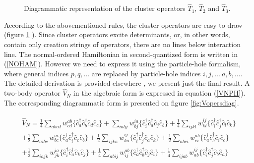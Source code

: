 \documentclass[twoside,english]{uiofysmaster}
\begin{document}
\begin{figure}[h!]
	\centering
	\bdiags
	\ediag
	\bdiags
	\ediag
	\bdiags
	\ediag
	\caption{Diagrammatic representation of the cluster operators $\hat{T}_1$, $\hat{T}_2$ and $\hat{T}_3$.} \label{fig:Topersdiag}
\end{figure}

According to the abovementioned rules, the cluster operators are easy
to draw (figure \ref{fig:Topersdiag} ). Since cluster operators excite
determinants, or, in other words, contain only creation strings of
operators, there are no lines below interaction line. The
normal-ordered Hamiltonian in second-quantized form is written in
(\ref{NOHAM}). However we need to express it using the particle-hole
formalism, where general indices $p,q,\dots$ are replaced by
particle-hole indices $i,j,\dots \ a,b,\dots$. The detailed derivation
is provided elsewhere \cite{S.KvaalLectureNotesFysKjm44802015}, we
present just the final result. A two-body operator $\hat{V}_N$ in the
algebraic form is expressed in equation (\ref{VNPH}). The
corresponding diagrammatic form is presented on figure
\ref{fig:Vopersdiag}.

\begin{align}\label{VNPH}
\begin{split}
\hat{V}_N = \frac{1}{4}\sum_{abcd} w^{ab}_{cd} \{\hat{c}^\dagger_a\hat{c}^\dagger_b\hat{c}_d\hat{c}_c\} + \sum_{iabj} w^{ia}_{bj} \{\hat{c}^\dagger_i\hat{c}^\dagger_a\hat{c}_j\hat{c}_b\} + \frac{1}{4}\sum_{ijkl} w^{ij}_{kl} \{\hat{c}^\dagger_i\hat{c}^\dagger_j\hat{c}_l\hat{c}_k\} \\+ \frac{1}{2}\sum_{aibc} w^{ai}_{bc} \{\hat{c}^\dagger_a\hat{c}^\dagger_i\hat{c}_c\hat{c}_b\} + \frac{1}{2}\sum_{ijka} w^{ij}_{ka} \{\hat{c}^\dagger_i\hat{c}^\dagger_j\hat{c}_a\hat{c}_k\} + \frac{1}{2}\sum_{abci} w^{ab}_{ci} \{\hat{c}^\dagger_a\hat{c}^\dagger_b\hat{c}_i\hat{c}_c\} \\+ \frac{1}{2}\sum_{iajk} w^{ia}_{jk} \{\hat{c}^\dagger_i\hat{c}^\dagger_a\hat{c}_k\hat{c}_j\} + \frac{1}{4}\sum_{abij} w^{ab}_{ij} \{\hat{c}^\dagger_a\hat{c}^\dagger_b\hat{c}_j\hat{c}_i\} + \frac{1}{4}\sum_{ijab} w^{ij}_{ab} \{\hat{c}^\dagger_i\hat{c}^\dagger_j\hat{c}_b\hat{c}_a\}
\end{split}
\end{align}
\end{document}
